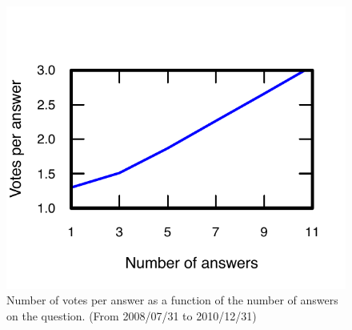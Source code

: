 \begin{figure}[!t]
    \centering
    \includegraphics[width=0.8\columnwidth]{img/Fig7_2010.pdf}
    \caption{Number of votes per answer as a function of the number of answers on the question. (From 2008/07/31 to 2010/12/31)}
    \label{fig:fig7_2010}
\end{figure}

